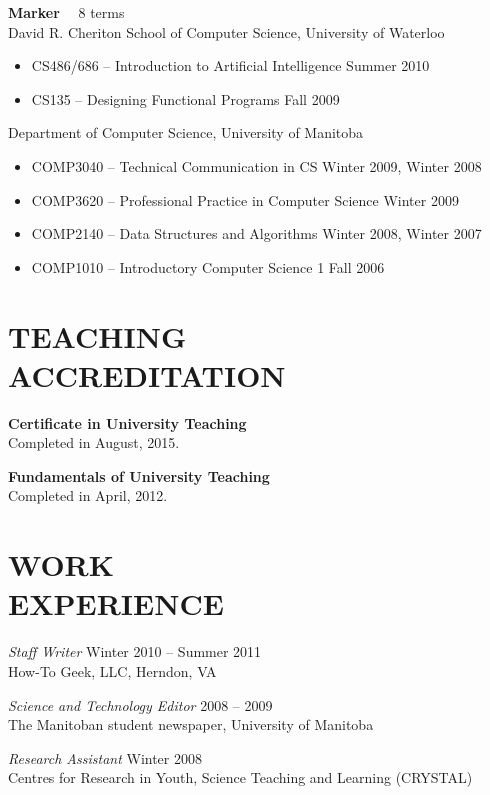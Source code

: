 \documentclass[line,margin]{res}
\begin{document}
\begin{resume}
{\bf Marker} ~~8 terms \vspace{4pt} \\
David R. Cheriton School of Computer Science, University of Waterloo
\begin{itemize}  \itemsep -2pt
  \item CS486/686 -- Introduction to Artificial Intelligence \hfill Summer 2010
  \item CS135 -- Designing Functional Programs \hfill Fall 2009
\end{itemize} \vspace{-4pt}
Department of Computer Science, University of Manitoba
\begin{itemize}  \itemsep -2pt
  \item COMP3040 -- Technical Communication in CS \hfill Winter 2009, Winter 2008
  \item COMP3620 -- Professional Practice in Computer Science \hfill Winter 2009
  \item COMP2140 -- Data Structures and Algorithms \hfill Winter 2008, Winter 2007
  \item COMP1010 -- Introductory Computer Science 1 \hfill Fall 2006
\end{itemize}

\section{TEACHING \\ACCREDITATION}

{\bf Certificate in University Teaching} \\
Completed in August, 2015.

{\bf Fundamentals of University Teaching} \\
Completed in April, 2012.

\section{WORK \\EXPERIENCE}

{\sl Staff Writer} \hfill Winter 2010 -- Summer 2011 \\
How-To Geek, LLC, Herndon, VA

{\sl Science and Technology Editor} \hfill 2008 -- 2009 \\
The Manitoban student newspaper, University of Manitoba

{\sl Research Assistant} \hfill Winter 2008 \\
Centres for Research in Youth, Science Teaching and Learning (CRYSTAL)


\end{resume}
\end{document}
